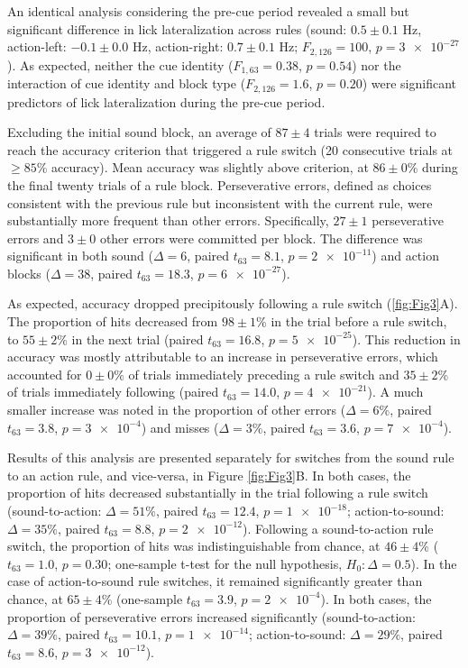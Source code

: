 An identical analysis considering the pre-cue period revealed a small but significant difference in lick lateralization across rules (sound: $0.5 \pm 0.1$ Hz, action-left: $-0.1 \pm 0.0$ Hz, action-right: $0.7 \pm 0.1$ Hz; $F_{2,126} =100$, $p=\num{3e-27}$). As expected, neither the cue identity ($F_{1,63} =0.38$, $p=0.54$) nor the interaction of cue identity and block type ($F_{2,126} =1.6$, $p=\num{0.20}$) were significant predictors of lick lateralization during the pre-cue period.

Excluding the initial sound block, an average of $87 \pm 4$ trials were required to reach the accuracy criterion that triggered a rule switch (20 consecutive trials at $ \geq 85\%$ accuracy). Mean accuracy was slightly above criterion, at $86 \pm 0 \%$ during the final twenty trials of a rule block. Perseverative errors, defined as choices consistent with the previous rule but inconsistent with the current rule, were substantially more frequent than other errors. Specifically, $27 \pm 1$ perseverative errors and $3 \pm 0$ other errors were committed per block. The difference was significant in both sound ($\Delta=6$, paired $t_{63} =8.1$, $p=\num{2e-11}$) and action blocks ($\Delta=38$, paired $t_{63} =18.3$, $p=\num{6e-27}$).



As expected, accuracy dropped precipitously following a rule switch (\ref{fig:Fig3}A). The proportion of hits decreased from $98 \pm 1 \%$ in the trial before a rule switch, to $55 \pm 2 \%$ in the next trial (paired $t_{63} =16.8$, $p=\num{5e-25}$). This reduction in accuracy was mostly attributable to an increase in perseverative errors, which accounted for $0 \pm 0 \%$ of trials immediately preceding a rule switch and $35 \pm 2 \%$ of trials immediately following (paired $t_{63}=14.0$, $p=\num{4e-21}$). A much smaller increase was noted in the proportion of other errors ($\Delta=6\%$, paired $t_{63}=3.8$, $p=\num{3e-4}$) and misses ($\Delta=3\%$, paired $t_{63}=3.6$, $p=\num{7e-4}$). 

Results of this analysis are presented separately for switches from the sound rule to an action rule, and vice-versa, in Figure \ref{fig:Fig3}B. In both cases, the proportion of hits decreased substantially in the trial following a rule switch (sound-to-action: $\Delta=51\%$, paired $t_{63} =12.4$, $p=\num{1e-18}$; action-to-sound: $\Delta=35\%$, paired $t_{63} =8.8$, $p=\num{2e-12}$). Following a sound-to-action rule switch, the proportion of hits was indistinguishable from chance, at $46 \pm 4 \%$ ($t_{63}=1.0$, $p=0.30$; one-sample t-test for the null hypothesis, $H_0:\Delta=0.5$). In the case of action-to-sound rule switches, it remained significantly greater than chance, at $65 \pm 4 \%$ (one-sample $t_{63}=3.9$, $p=\num{2e-4}$). In both cases, the proportion of perseverative errors increased significantly (sound-to-action: $\Delta=39\%$, paired $t_{63} =10.1$, $p=\num{1e-14}$; action-to-sound: $\Delta=29\%$, paired $t_{63} =8.6$, $p=\num{3e-12}$).  

